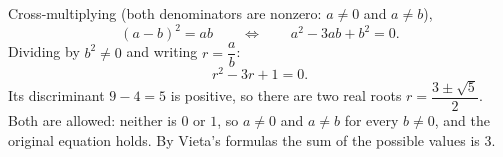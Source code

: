 Cross-multiplying (both denominators are nonzero: $a\ne0$ and $a\ne b$),
\[
(a-b)^2=ab\qquad\Longleftrightarrow\qquad a^2-3ab+b^2=0 .
\]
Dividing by $b^2\ne0$ and writing $r=\dfrac {a}{b}$:
\[
r^2-3r+1=0 .
\]
Its discriminant $9-4=5$ is positive, so there are two real roots $r=\dfrac{3\pm\sqrt5}{2}$. Both are allowed: neither is $0$ or $1$, so $a\ne0$ and $a\ne b$ for every $b\ne0$, and the original equation holds. By Vieta's formulas the sum of the possible values is $\boxed{3}$.
